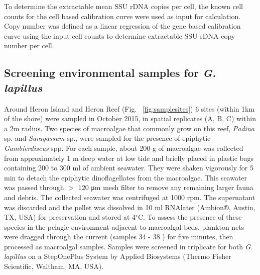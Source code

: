 \documentclass[12pt]{article}
\begin{document}
To determine the extractable mean SSU rDNA copies per cell, the known cell counts for the cell based calibration curve were used as input for calculation. 
Copy number was defined as a linear regression of the gene based calibration curve using the input cell counts to determine extractable SSU rDNA copy number per cell.

\subsection*{Screening environmental samples for \emph{G. lapillus}}%
\FloatBarrier
Around Heron Island and Heron Reef (Fig. ~\ref{fig:samplesites}) 6 sites (within 1km of the shore) were sampled in October 2015, in spatial replicates (A, B, C) within a 2m radius. 
Two species of macroalgae that commonly grow on this reef, \textit{Padina} sp. and \textit{Saragassum} sp., were sampled for the presence of epiphytic \emph{Gambierdiscus} spp. For each sample, about 200 g of macroalgae was collected from approximately 1 m deep water at low tide and briefly placed in plastic bags containing 200 to 300 ml of ambient seawater. 
They were shaken vigorously for 5 min to detach the epiphytic dinoflagellates from the macroalgae. 
This seawater was passed through $>$ 120 μm mesh filter to remove any remaining larger fauna and debris. 
The collected seawater was centrifuged at 1000 rpm. The supernatant was discarded and the pellet was dissolved in 10 ml RNAlater (Ambion®, Austin, TX, USA) for preservation and stored at 4$^{\circ}$C.
To assess the presence of these species in the pelagic environment adjacent to macroalgal beds, plankton nets were dragged through the current (samples 34 - 38 %
) for five minutes, then processed as macroalgal samples.
Samples were screened in triplicate for both \emph{G. lapillus} %
on a StepOnePlus System by Applied Biosystems (Thermo Fisher Scientific, Waltham, MA, USA).
\end{document}
